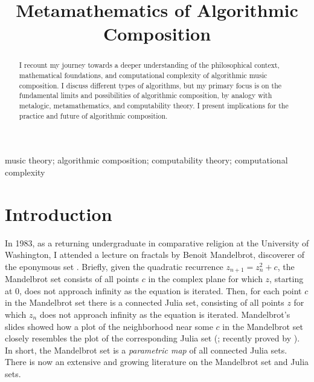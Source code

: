 \documentclass[]{interact}
\theoremstyle{plain}%
\theoremstyle{definition}
\theoremstyle{remark}
\begin{document}

\title{Metamathematics of Algorithmic Composition}

\author{
}

\maketitle

\begin{abstract}
I recount my journey towards a deeper understanding of the philosophical context, mathematical foundations, and computational complexity of algorithmic music composition. I discuss different types of algorithms, but my primary focus is on the fundamental limits and possibilities of algorithmic composition, by analogy with metalogic, metamathematics, and computability theory. I present implications for the practice and future of algorithmic composition. 
\end{abstract}

\begin{keywords}
music theory; algorithmic composition; computability theory; computational complexity
\end{keywords}
\section{Introduction}

In 1983, as a returning undergraduate in comparative religion at the University of Washington, I attended a lecture on fractals by Benoit Mandelbrot, discoverer of the eponymous set \citep{citeulike:580392, peitgen2004mandelbrot}. Briefly, given the quadratic recurrence $z_{n+1} = z_n^2 + c$, the Mandelbrot set consists of all points $c$ in the complex plane for which $z$, starting at 0, does not approach infinity as the equation is iterated. Then, for each point $c$ in the Mandelbrot set there is a connected Julia set, consisting of all points $z$ for which $z_n$ does not approach infinity as the equation is iterated. Mandelbrot's slides showed how a plot of the neighborhood near some $c$ in the Mandelbrot set closely resembles the plot of the corresponding Julia set (\citet{lei1990similarity}; recently proved by \citet{kawahira2018julia}). In short, the Mandelbrot set is a \emph{parametric map} of all connected Julia sets. There is now an extensive and growing literature on the Mandelbrot set and Julia sets. 
\end{document}
